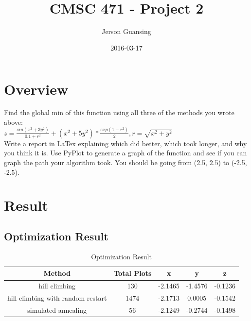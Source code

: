 \documentclass{article}
\title{CMSC 471 - Project 2}
\date{2016-03-17}
\author{Jerson Guansing}
\begin{document}
  \maketitle
  \newpage
  \tableofcontents
  \newpage

  \section{Overview}
  
  Find the global min of this function using all three of the methods you wrote above:\\
  
  $z = \frac{sin(x^2 + 3y^2)}{0.1 + r^2} + (x^2 + 5y^2) * \frac{exp(1 - r^2)}{2}, r = \sqrt{x^2 + y^2}$ \\
  
  Write a report in LaTex explaining which did better, which took longer, and why you think it is.  Use PyPlot to generate a graph of the function and see if you can graph the path your algorithm took.  You should be going from (2.5, 2.5) to (-2.5, -2.5).\\
  
  \section{Result}
  
   \subsection{Optimization Result}
  \begin{table}[h]
  	\centering
  	\caption{Optimization Result}
  	\label{tab:table1}
  	\begin{tabular}{|c|c|c|c|c|}
  	\hline
  	Method & Total Plots & x & y & z \\
  	\hline
  	hill climbing & 130 & -2.1465 & -1.4576 & -0.1236 \\
  	\hline
  	hill climbing with random restart & 1474 & -2.1713 & 0.0005 & -0.1542 \\
  	\hline
  	simulated annealing & 56 & -2.1249 & -0.2744 & -0.1498 \\
  	\hline
  \end{tabular}
  \end{table}
  
\end{document}
